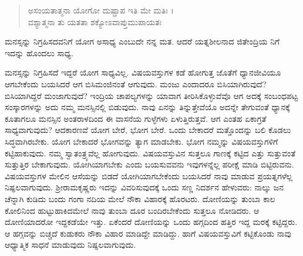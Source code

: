 \begin{verse}
ಅಸಂಯತಾತ್ಮನಾ ಯೋಗೋ ದುಷ್ಪ್ರಾಪ ಇತಿ ಮೇ ಮತಿಃ ।\\ವಶ್ಯಾತ್ಮನಾ ತು ಯತತಾ ಶಕ್ಯೋಽವಾಪ್ತುಮುಪಾಯತಃ 
\end{verse}

{\small ಮನಸ್ಸನ್ನು ನಿಗ್ರಹಿಸದವನಿಗೆ ಯೋಗ ಅಸಾಧ್ಯ ಎಂಬುದೇ ನನ್ನ ಮತ. ಆದರೆ ಯತ್ನಶೀಲನಾದ ಜಿತೇಂದ್ರಿಯ ನಿಗೆ ಇದನ್ನು ಹೊಂದಲು ಸಾಧ್ಯ.}

ಮನಸ್ಸನ್ನು ನಿಗ್ರಹಿಸದೆ ಇದ್ದರೆ ಯೋಗ ಸಾಧ್ಯವಿಲ್ಲ. ವಿಷಯವಸ್ತುಗಳ ಕಡೆ ಹೋಗುತ್ತ ಜೊತೆಗೆ ಧ್ಯಾನಜೀವಿಯೂ ಆಗಬೇಕೆಂದು ಬಯಸಿದರೆ ಆಗ ಬಿಸಿಮಂಜಿನಂತೆ ಆಗುವುದು. ಮಂಜು ಎಂದಾದರೂ ಬಿಸಿಯಾಗಿರುವುದೆ? ಬಿಸಿಯಾಗಿದ್ದರೆ ಮಂಜಾಗುವುದೆ? ಇಂದ್ರಿಯ ಚಾಪಲ್ಯಗಳನ್ನು ಯಾವಾಗ ತೀರಿಸಿಕೊಳ್ಳುವೆವೊ ಆಗ ಅದಕ್ಕೆ ಸಂಬಂಧಪಟ್ಟ ಸಂಸ್ಕಾರಗಳನ್ನು ಅದು ನಮ್ಮ ಮನಸ್ಸಿನಲ್ಲಿ ಬಿಡುವುದು. ನಾವು ಏನನ್ನು ತಿನ್ನುತ್ತೇವೆಯೊ ಅದನ್ನೇ ತೇಗುವಂತೆ ಧ್ಯಾನಕ್ಕೆ ಕೂತಾಗಲೂ ಮನಸ್ಸಿನ ಅಂತರಾಳದಿಂದ ಈ ವಾಸನೆಯ ಗುಳ್ಳೆಗಳು ಏಳುತ್ತಿರುತ್ತವೆ. ಆಗ ಎಂತಹ ಏಕಾಗ್ರತೆ ಸಾಧ್ಯವಾಗುವುದು? ಆದಕಾರಣವೆ ಯೋಗ ಬೇರೆ, ಭೋಗ ಬೇರೆ. ಒಂದು ಬೇಕಾದರೆ ಮತ್ತೊಂದನ್ನು ಬಲಿ ಕೊಡಲು ಸಿದ್ಧವಾಗಿರಬೇಕು. ಯೋಗ ಬೇಕಾದರೆ ಭೋಗವನ್ನು ತ್ಯಾಗ ಮಾಡಬೇಕು. ಭೋಗ ನಮ್ಮನ್ನು ವಿಷಯವಸ್ತುಗಳಿಗೆ ಕಟ್ಟಿಹಾಕುವುದು. ನಮ್ಮ ಸ್ವಾತಂತ್ರ್ಯವೆಲ್ಲ ಹೋಗುವುದು. ವಿಷಯವಸ್ತುವಿನ ಸುತ್ತಲೂ ಗಾಣಕ್ಕೆ ಕಟ್ಟಿದ ಎತ್ತು ಸುತ್ತುವಂತೆ ಸುತ್ತುತ್ತಿರ ಬೇಕಾಗುವುದು. ಯೋಗಿಯಾಗಬೇಕು ಎಂದು ಬಯಸುವವನು ಇವುಗಳನ್ನೆಲ್ಲ ಪರೀಕ್ಷೆ ಮಾಡಿ ಬಿಟ್ಟಿರುವನು. ವಿಷಯವಸ್ತುಗಳ ಮೇಲಿನ ಆಸೆಯನ್ನು ಬಿಡದೆ ಯೋಗಿಯಾಗಬೇಕೆಂದು ಬಯಸಿದರೆ ನಾವು ಮಾಡುವ ಪ್ರಯತ್ನಗಳೆಲ್ಲ ನಿಷ್ಫಲವಾಗುವುದು. ಶ್ರೀರಾಮಕೃಷ್ಣರು ಇದನ್ನು ವಿವರಿಸುವುದಕ್ಕೆ ಒಂದು ಸಣ್ಣ ನಿದರ್ಶನ ಹೇಳುವರು: ನಾಲ್ಕು ಜನ ಚೆನ್ನಾಗಿ ಕುಡಿದು ಬಂದು ಗಂಗಾ ನದಿಯ ಮೇಲೆ ನೌಕಾ ವಿಹಾರಕ್ಕೆ ಹೊರಟರು. ದೋಣಿಯನ್ನು ತುಂಬಾ ಕಾಲ ಕೋಲಿನಿಂದ ಹುಟ್ಟುಹಾಕಿದಮೇಲೆ ನಾವು ತುಂಬಾ ದೂರ ಬಂದಿರಬೇಕೆಂದು ಸುತ್ತಲೂ ನೋಡಿದರು. ಆ ದೋಣಿಯಾದರೋ ಇದ್ದಕಡೆಯೇ ಇತ್ತು. ಏಕೆಂದರೆ ದೋಣಿಯನ್ನು ಒಂದು ಹಗ್ಗದಿಂದ ಹತ್ತಿರ ಇದ್ದ ಮರಕ್ಕೆ ಕಟ್ಟಿದ್ದರು. ಆ ಹಗ್ಗವನ್ನು ಬಿಚ್ಚದೆ ಕುಡುಕರು ನೌಕಾ ವಿಹಾರ ಮಾಡಿದ್ದೇ ಮಾಡಿದ್ದು. ಹಾಗೆ ವಿಷಯವಸ್ತುವಿಗೆ ಕಟ್ಟಿಕೊಂಡು ನಾವು ಆಧ್ಯಾತ್ಮಿಕ ಸಾಧನೆ ಮಾಡುವುದು ನಿಷ್ಫಲವಾಗುವುದು.

